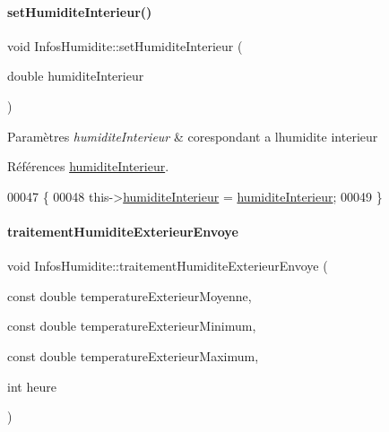 \paragraph{\texorpdfstring{set\+Humidite\+Interieur()}{setHumiditeInterieur()}}
{\footnotesize\ttfamily void Infos\+Humidite\+::set\+Humidite\+Interieur (\begin{DoxyParamCaption}\item[{double}]{humidite\+Interieur }\end{DoxyParamCaption})}


\begin{DoxyParams}{Paramètres}
{\em humidite\+Interieur} & corespondant a l\textquotesingle{}humidite interieur \\
\hline
\end{DoxyParams}


Références \hyperlink{class_infos_humidite_ad2847e671ad0b90f8dc0940dee107c38}{humidite\+Interieur}.


\begin{DoxyCode}
00047 \{
00048     this->\hyperlink{class_infos_humidite_ad2847e671ad0b90f8dc0940dee107c38}{humiditeInterieur} = \hyperlink{class_infos_humidite_ad2847e671ad0b90f8dc0940dee107c38}{humiditeInterieur};
00049 \}
\end{DoxyCode}
\mbox{\label{class_infos_humidite_abd0535dee74a4588232d282d0fe64829}} 
\paragraph{\texorpdfstring{traitement\+Humidite\+Exterieur\+Envoye}{traitementHumiditeExterieurEnvoye}}
{\footnotesize\ttfamily void Infos\+Humidite\+::traitement\+Humidite\+Exterieur\+Envoye (\begin{DoxyParamCaption}\item[{const double}]{temperature\+Exterieur\+Moyenne,  }\item[{const double}]{temperature\+Exterieur\+Minimum,  }\item[{const double}]{temperature\+Exterieur\+Maximum,  }\item[{int}]{heure }\end{DoxyParamCaption})\hspace{0.3cm}{\ttfamily [signal]}}



